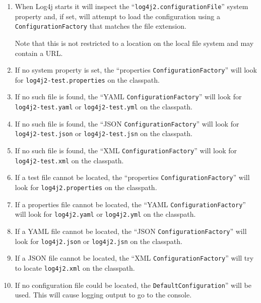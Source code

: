 \documentclass[11pt,a4paper, titlepage, parskip=half, headsepline, footsepline, cleardoublepage=current, headheight=1cm]{scrbook}
\begin{document}
\begin{enumerate}
\item{When Log4j starts it will inspect the “\verb#log4j2.configurationFile#” system property and, if set, will attempt to load the configuration using a \lstinline|ConfigurationFactory| that matches the file extension.

Note that this is not restricted to a location on the local file system and may contain a URL.}

\item{If no system property is set, the “properties \lstinline|ConfigurationFactory|” will look for \verb#log4j2-test.properties# on the classpath.}

\item{If no such file is found, the “YAML \lstinline|ConfigurationFactory|” will look for \verb#log4j2-test.yaml# or \verb#log4j2-test.yml# on the classpath.}

\item{If no such file is found, the “JSON \lstinline|ConfigurationFactory|” will look for \verb#log4j2-test.json# or \verb#log4j2-test.jsn# on the classpath.}

\item{If no such file is found, the “XML \lstinline|ConfigurationFactory|” will look for \verb#log4j2-test.xml# on the classpath.}

\item{If a test file cannot be located, the “properties \lstinline|ConfigurationFactory|” will look for \verb#log4j2.properties# on the classpath.}

\item{If a properties file cannot be located, the “YAML \lstinline|ConfigurationFactory|” will look for \verb#log4j2.yaml# or \verb#log4j2.yml# on the classpath.}

\item{If a YAML file cannot be located, the “JSON \lstinline|ConfigurationFactory|” will look for \verb#log4j2.json# or \verb#log4j2.jsn# on the classpath.}

\item{If a JSON file cannot be located, the “XML \lstinline|ConfigurationFactory|” will try to locate \verb#log4j2.xml# on the classpath.}

\item{If no configuration file could be located, the \lstinline|DefaultConfiguration|” will be used. This will cause logging output to go to the console.}
\end{enumerate}
\end{document}
